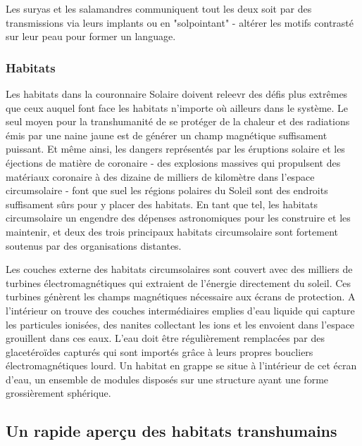                                                 Les suryas et les salamandres communiquent tout les deux soit par des transmissions via leurs implants ou en "solpointant" - altérer les motifs contrasté sur leur peau pour former un language. 

                                                \subsubsection{Habitats} \label{sec:habitats-1} 

                                                Les habitats dans la couronnaire Solaire doivent releevr des défis plus extrêmes que ceux auquel font face les habitats n'importe où ailleurs dans le système. Le seul moyen pour la transhumanité de se protéger de la chaleur et des radiations émis par une naine jaune est de générer un champ magnétique suffisament puissant. Et même ainsi, les dangers représentés par les éruptions solaire et les éjections de matière de coronaire - des explosions massives qui propulsent des matériaux coronaire à des dizaine de milliers de kilomètre dans l'espace circumsolaire - font que suel les régions polaires du Soleil sont des endroits suffisament sûrs pour y placer des habitats. En tant que tel, les habitats circumsolaire un engendre des dépenses astronomiques pour les construire et les maintenir, et deux des trois principaux habitats circumsolaire sont fortement soutenus par des organisations distantes. 

                                                Les couches externe des habitats circumsolaires sont couvert avec des milliers de turbines électromagnétiques qui extraient de l'énergie directement du soleil. Ces turbines génèrent les champs magnétiques nécessaire aux écrans de protection. A l'intérieur on trouve des couches intermédiaires emplies d'eau liquide qui capture les particules ionisées, des nanites collectant les ions et les envoient dans l'espace grouillent dans ces eaux. L'eau doit être régulièrement remplacées par des glacetéroïdes capturés qui sont importés grâce à leurs propres boucliers électromagnétiques lourd. Un habitat en grappe se situe à l'intérieur de cet écran d'eau, un ensemble de modules disposés sur une structure ayant une forme grossièrement sphérique. 

                                                \subsection{Un rapide aperçu des habitats transhumains} \label{sec:quick-prim-transh} 

